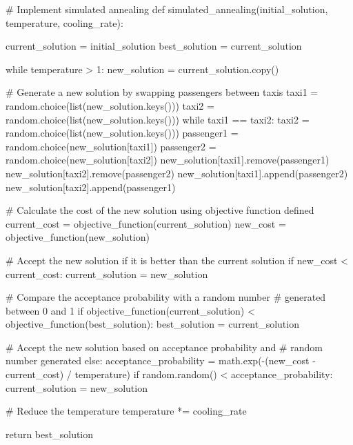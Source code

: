 \documentclass{article}
\begin{document}
\begin{pythoncode}
# Implement simulated annealing
def simulated_annealing(initial_solution, temperature, cooling_rate):
  
  current_solution = initial_solution
  best_solution = current_solution
  
  while temperature > 1:
    new_solution = current_solution.copy()
    
    # Generate a new solution by swapping passengers between taxis
    taxi1 = random.choice(list(new_solution.keys()))
    taxi2 = random.choice(list(new_solution.keys()))
    while taxi1 == taxi2:
      taxi2 = random.choice(list(new_solution.keys()))
    passenger1 = random.choice(new_solution[taxi1])
    passenger2 = random.choice(new_solution[taxi2])
    new_solution[taxi1].remove(passenger1)
    new_solution[taxi2].remove(passenger2)
    new_solution[taxi1].append(passenger2)
    new_solution[taxi2].append(passenger1)

    # Calculate the cost of the new solution using objective function defined
    current_cost = objective_function(current_solution)
    new_cost = objective_function(new_solution)
    
    # Accept the new solution if it is better than the current solution
    if new_cost < current_cost:
      current_solution = new_solution
      
      # Compare the acceptance probability with a random number
      # generated between 0 and 1
      if objective_function(current_solution) < objective_function(best_solution):
        best_solution = current_solution
    
    # Accept the new solution based on acceptance probability and 
    # random number generated
    else:
      acceptance_probability = math.exp(-(new_cost - current_cost) / temperature)
      if random.random() < acceptance_probability:
        current_solution = new_solution
    
    # Reduce the temperature
    temperature *= cooling_rate

  return best_solution
\end{pythoncode}

\newpage
\end{document}
